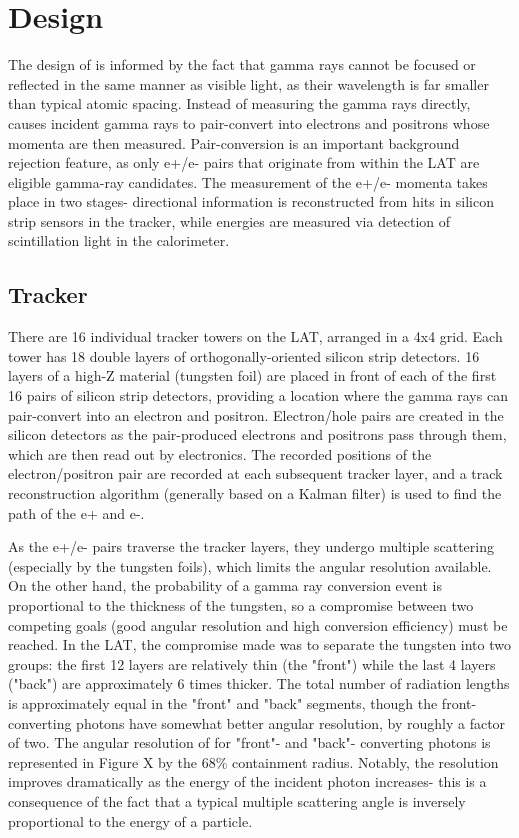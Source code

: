 \section{Design}
The design of \FermiLAT is informed by the fact that gamma rays cannot be focused or reflected in the same manner as visible light, as their wavelength is far smaller than typical atomic spacing. Instead of measuring the gamma rays directly, \FermiLAT causes incident gamma rays to pair-convert into electrons and positrons whose momenta are then measured. Pair-conversion is an important background rejection feature, as only e+/e- pairs that originate from within the LAT are eligible gamma-ray candidates. The measurement of the e+/e- momenta takes place in two stages- directional information is reconstructed from hits in silicon strip sensors in the tracker, while energies are measured via detection of scintillation light in the calorimeter.

\subsection{Tracker}
There are 16 individual tracker towers on the LAT, arranged in a 4x4 grid. Each tower has 18 double layers of orthogonally-oriented silicon strip detectors. 16 layers of a high-Z material (tungsten foil) are placed in front of each of the first 16 pairs of silicon strip detectors, providing a location where the gamma rays can pair-convert into an electron and positron. Electron/hole pairs are created in the silicon detectors as the pair-produced electrons and positrons pass through them, which are then read out by electronics. The recorded positions of the electron/positron pair are recorded at each subsequent tracker layer, and a track reconstruction algorithm (generally based on a Kalman filter) is used to find the path of the e+ and e-.

As the e+/e- pairs traverse the tracker layers, they undergo multiple scattering (especially by the tungsten foils), which limits the angular resolution available. On the other hand, the probability of a gamma ray conversion event is proportional to the thickness of the tungsten, so a compromise between two competing goals (good angular resolution and high conversion efficiency) must be reached. In the LAT, the compromise made was to separate the tungsten into two groups: the first 12 layers are relatively thin (the "front") while the last 4 layers ("back") are approximately 6 times thicker. The total number of radiation lengths is approximately equal in the "front" and "back" segments, though the front-converting photons have somewhat better angular resolution, by roughly a factor of two.
The angular resolution of \FermiLAT for "front"- and "back"- converting photons is represented in Figure X by the 68\% containment radius. Notably, the resolution improves dramatically as the energy of the incident photon increases- this is a consequence of the fact that a typical multiple scattering angle is inversely proportional to the energy of a particle.

